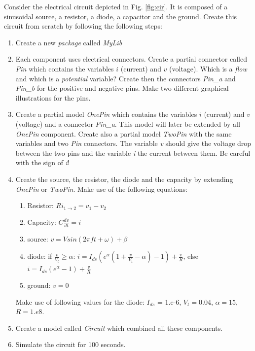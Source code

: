 \documentclass[10pt,a4paper]{article}
\begin{document}
Consider the electrical circuit depicted in Fig. \ref{fig:cir}. It is composed of a sinusoidal source, a resistor, a diode, a capacitor and the ground. Create this circuit from scratch by following the following steps:


\begin{enumerate}
\item Create a new \textit{package} called \textit{MyLib}
\item Each component uses electrical connectors. Create a partial connector called \textit{Pin} which contains the variables $i$ (current) and $v$ (voltage). Which is a \textit{flow} and which is a \textit{potential} variable? Create then the connectors \textit{Pin\_a} and \textit{Pin\_b} for the positive and negative pins. Make two different graphical illustrations for the pins.
\item Create a partial model \textit{OnePin} which contains the variables $i$ (current) and $v$ (voltage) and a connector \textit{Pin\_a}. This model will later be extended by all \textit{OnePin} component. Create also a partial model \textit{TwoPin} with the same variables and two \textit{Pin} connectors. The variable \textit{v} should give the voltage drop between the two pins and the variable \textit{i} the current between them. Be careful with the sign of \textit{i}!
\item Create the source, the resistor, the diode and the capacity by extending \textit{OnePin} or \textit{TwoPin}. Make use of the following equations:
\begin{enumerate}
\item Resistor: $R i_{1 \rightarrow 2} = v_1 - v_2$
\item Capacity: $C \frac{d v}{dt} = i$
\item source: $v = V sin( 2 \pi f t + \omega) + \beta$
\item diode: if $ \frac{v}{V_t} \geq \alpha$: $i = I_{ds} ( e^\alpha ( 1 + \frac{v}{V_t} - \alpha) - 1) + \frac{v}{R}$, else $i = I_{ds} (e^\alpha - 1) + \frac{v}{R}$
\item ground: $ v = 0$
\end{enumerate}
Make use of following values for the diode: $I_{ds}$ = 1.e-6, $V_t=0.04$, $\alpha=15$, $R=1.e8$.
\item Create a model called \textit{Circuit} which combined all these components.
\item Simulate the circuit for 100 seconds.
\end{enumerate}
\end{document}
